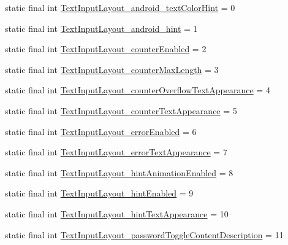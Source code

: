 \begin{DoxyCompactItemize}
\item 
static final int \mbox{\hyperlink{classandroid_1_1support_1_1design_1_1_r_1_1styleable_ab77cba46b196f367d3323117ad3f3e37}{Text\+Input\+Layout\+\_\+android\+\_\+text\+Color\+Hint}} = 0
\item 
static final int \mbox{\hyperlink{classandroid_1_1support_1_1design_1_1_r_1_1styleable_acacd639ef9f0f53a5980cca280c4454d}{Text\+Input\+Layout\+\_\+android\+\_\+hint}} = 1
\item 
static final int \mbox{\hyperlink{classandroid_1_1support_1_1design_1_1_r_1_1styleable_a0b04736f1937ba38deb9170778f6d5a1}{Text\+Input\+Layout\+\_\+counter\+Enabled}} = 2
\item 
static final int \mbox{\hyperlink{classandroid_1_1support_1_1design_1_1_r_1_1styleable_a556b29734154f6ea1a537f88e10da948}{Text\+Input\+Layout\+\_\+counter\+Max\+Length}} = 3
\item 
static final int \mbox{\hyperlink{classandroid_1_1support_1_1design_1_1_r_1_1styleable_a45b455acc3c3acb00f7a36db187d9476}{Text\+Input\+Layout\+\_\+counter\+Overflow\+Text\+Appearance}} = 4
\item 
static final int \mbox{\hyperlink{classandroid_1_1support_1_1design_1_1_r_1_1styleable_ab6dcd12d97c289aa435c8e54b432300e}{Text\+Input\+Layout\+\_\+counter\+Text\+Appearance}} = 5
\item 
static final int \mbox{\hyperlink{classandroid_1_1support_1_1design_1_1_r_1_1styleable_ae2e5a1172c99efe3544ea5ffdaac92b6}{Text\+Input\+Layout\+\_\+error\+Enabled}} = 6
\item 
static final int \mbox{\hyperlink{classandroid_1_1support_1_1design_1_1_r_1_1styleable_a4d09e62deb1742d02e30465768411166}{Text\+Input\+Layout\+\_\+error\+Text\+Appearance}} = 7
\item 
static final int \mbox{\hyperlink{classandroid_1_1support_1_1design_1_1_r_1_1styleable_a62485d8990046222153bfc36f409acb4}{Text\+Input\+Layout\+\_\+hint\+Animation\+Enabled}} = 8
\item 
static final int \mbox{\hyperlink{classandroid_1_1support_1_1design_1_1_r_1_1styleable_a41e9545f0ccf662d796d06d6b67e254b}{Text\+Input\+Layout\+\_\+hint\+Enabled}} = 9
\item 
static final int \mbox{\hyperlink{classandroid_1_1support_1_1design_1_1_r_1_1styleable_a2d3b7ce259d0043d39a949a759dd729d}{Text\+Input\+Layout\+\_\+hint\+Text\+Appearance}} = 10
\item 
static final int \mbox{\hyperlink{classandroid_1_1support_1_1design_1_1_r_1_1styleable_ab3a09db55a9bd8349fd2d14ce511a7d1}{Text\+Input\+Layout\+\_\+password\+Toggle\+Content\+Description}} = 11

\end{DoxyCompactItemize}
